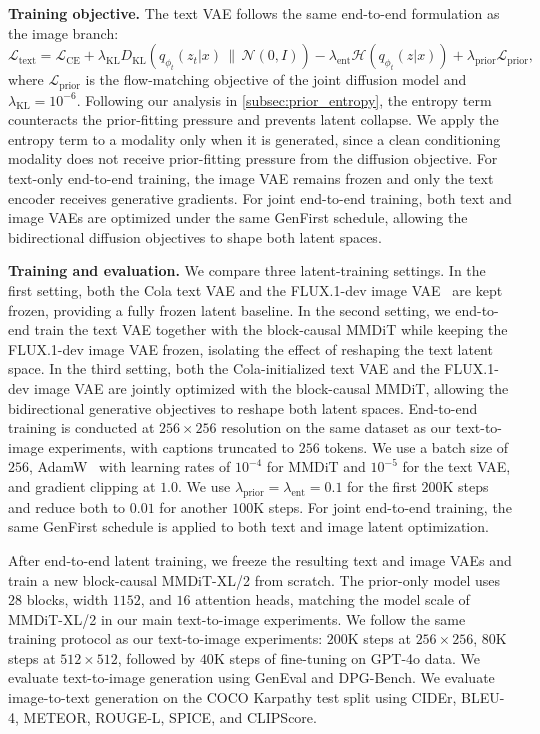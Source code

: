\textbf{Training objective.}
The text VAE follows the same end-to-end formulation as the image branch:
\begin{equation}
\mathcal{L}_{\mathrm{text}}
=
\mathcal{L}_{\mathrm{CE}}
+
\lambda_{\mathrm{KL}}
D_{\mathrm{KL}}\!\left(q_{\phi_t}(z_t|x)\,\|\,\mathcal{N}(0,I)\right)
-
\lambda_{\mathrm{ent}}
\mathcal{H}\!\left(q_{\phi_t}(z|x)\right)
+
\lambda_{\mathrm{prior}}
\mathcal{L}_{\mathrm{prior}},
\end{equation}
where $\mathcal{L}_{\mathrm{prior}}$ is the flow-matching objective of the joint diffusion model and $\lambda_{\mathrm{KL}}=10^{-6}$.
Following our analysis in \cref{subsec:prior_entropy}, the entropy term counteracts the prior-fitting pressure and prevents latent collapse.
We apply the entropy term to a modality only when it is generated, since a clean conditioning modality does not receive prior-fitting pressure from the diffusion objective.
For text-only end-to-end training, the image VAE remains frozen and only the text encoder receives generative gradients.
For joint end-to-end training, both text and image VAEs are optimized under the same GenFirst schedule, allowing the bidirectional diffusion objectives to shape both latent spaces.

\textbf{Training and evaluation.}
We compare three latent-training settings.
In the first setting, both the Cola text VAE and the FLUX.1-dev image VAE~\cite{flux1} are kept frozen, providing a fully frozen latent baseline.
In the second setting, we end-to-end train the text VAE together with the block-causal MMDiT while keeping the FLUX.1-dev image VAE frozen, isolating the effect of reshaping the text latent space.
In the third setting, both the Cola-initialized text VAE and the FLUX.1-dev image VAE are jointly optimized with the block-causal MMDiT, allowing the bidirectional generative objectives to reshape both latent spaces.
End-to-end training is conducted at $256\times256$ resolution on the same dataset as our text-to-image experiments, with captions truncated to $256$ tokens.
We use a batch size of $256$, AdamW~\cite{adamw} with learning rates of $10^{-4}$ for MMDiT and $10^{-5}$ for the text VAE, and gradient clipping at $1.0$.
We use $\lambda_{\mathrm{prior}}=\lambda_{\mathrm{ent}}=0.1$ for the first $200$K steps and reduce both to $0.01$ for another $100$K steps.
For joint end-to-end training, the same GenFirst schedule is applied to both text and image latent optimization.

After end-to-end latent training, we freeze the resulting text and image VAEs and train a new block-causal MMDiT-XL/2 from scratch.
The prior-only model uses $28$ blocks, width $1152$, and $16$ attention heads, matching the model scale of MMDiT-XL/2 in our main text-to-image experiments.
We follow the same training protocol as our text-to-image experiments: $200$K steps at $256\times256$, $80$K steps at $512\times512$, followed by $40$K steps of fine-tuning on GPT-4o data.
We evaluate text-to-image generation using GenEval and DPG-Bench. We evaluate image-to-text generation on the COCO Karpathy test split using CIDEr, BLEU-4, METEOR, ROUGE-L, SPICE, and CLIPScore.





